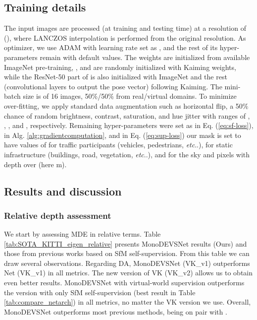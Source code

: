 \documentclass[journal]{IEEEtran}
\makeatletter
\DeclareRobustCommand\onedot{\futurelet\@let@token\@onedot}
\def\@onedot{\ifx\@let@token.\else.\null\fi\xspace}
\def\etc{\emph{etc}\onedot} \def\vs{\emph{vs}\onedot}
\newcommand{\Eq}[1]{Eq. (\ref{eq:#1})}
\newcommand{\Tab}[1]{Table \ref{tab:#1}}
\newcommand{\Alg}[1]{Alg. \ref{alg:#1}}
\makeatother
\begin{document}
\subsection{Training details}
\label{ssec:training}

The input images are processed (at training and testing time) at a resolution of  ({}), where LANCZOS interpolation is performed from the  original resolution. As optimizer, we use ADAM with learning rate set as , and the rest of its hyper-parameters remain with default values. The weights  are initialized from available ImageNet pre-training, , and  are randomly initialized with Kaiming weights, while the ResNet-50 part of  is also initialized with ImageNet and the rest (convolutional layers to output the pose vector) following Kaiming. The mini-batch size is of 16 images, 50\%/50\% from real/virtual domains. To minimize over-fitting, we apply standard data augmentation such as horizontal flip, a 50\% chance of random brightness, contrast, saturation, and hue jitter with ranges of , , , and , respectively. Remaining hyper-parameters were set as  in \Eq{sf-loss},  in \Alg{gradientcomputation}, and in \Eq{sup-loss} our mask  is set to have values of  for traffic participants (vehicles, pedestrians, {\etc}),  for static infrastructure (buildings, road, vegetation, {\etc}), and  for the sky and pixels with depth over  (here m).



\subsection{Results and discussion}
\label{ssec:results}

\subsubsection{Relative depth assessment}
We start by assessing MDE in relative terms. Table \ref{tab:SOTA_KITTI_eigen_relative} presents MonoDEVSNet results (Ours) and those from previous works based on SfM self-supervision. From this table we can draw several observations. Regarding DA, MonoDEVSNet (VK\_v1) outperforms Net (VK\_v1) in all metrics. The new version of VK (VK\_v2) allows us to obtain even better results. MonoDEVSNet with virtual-world supervision outperforms the version with only SfM self-supervision (best result in \Tab{compare_netarch}) in all metrics, no matter the VK version we use. Overall, MonoDEVSNet outperforms most previous methods, being on pair with  \cite{Guizilini:2020semantic}.
\end{document}
